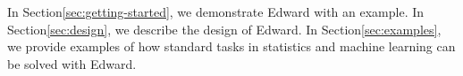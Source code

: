 In Section\nobreakspace \ref {sec:getting-started},
we demonstrate Edward with an example.
In Section\nobreakspace \ref {sec:design},
we describe the design of Edward.
In Section\nobreakspace \ref {sec:examples},
we provide examples of how standard tasks in statistics and machine learning can be solved with Edward.
